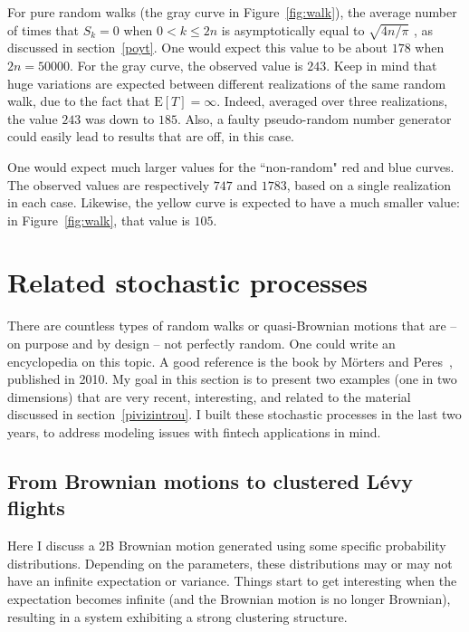 \documentclass[oneside,10pt]{book}
\begin{document}
For pure random walks (the gray curve in Figure~\ref{fig:walk}), the average number of times that $S_k=0$ when $0<k\leq 2n$
 is asymptotically equal to $\sqrt{4n/\pi}$ , as discussed in section~\ref{poyt}. One would expect this value to be about $178$
 when $2n=\num{50000}$. For the gray curve, the observed value is $243$. Keep in mind that huge variations are expected between different realizations of the same random walk, due to the fact that $\text{E}[T]=\infty$. Indeed, averaged over three realizations, the value $243$ was down to 
$185$. Also, a faulty pseudo-random number generator could easily lead to results that are off, in this case.

One would expect much larger 
 values for the ``non-random" red and blue curves. The observed 
values are respectively $747$ and $1783$, based on a single realization in each case. Likewise, the yellow curve is expected to have a much smaller value: in Figure~\ref{fig:walk}, 
that value is $105$.

 
\section{Related stochastic processes}  

There are countless types of random walks or quasi-Brownian motions that are -- on purpose and by design -- not perfectly random. One could write an encyclopedia on
 this topic. A good reference is the book by Mörters and Peres~\cite{peresbrown}, published in 2010.
My goal in this section is to present two examples (one in two dimensions) that are very recent, interesting, and related to the material 
 discussed in section~\ref{pivizintrou}. I built these stochastic processes in the last two years, to address modeling issues with fintech applications in mind.



\subsection{From Brownian motions to clustered Lévy flights}\label{lvfgf}

Here I discuss a 2B Brownian motion generated using some specific probability distributions. Depending on the parameters, these distributions may or may not have an infinite expectation or variance. Things start to get interesting when the expectation becomes infinite (and the Brownian motion is no
 longer Brownian), resulting in a system exhibiting a strong clustering structure. 
\end{document}

